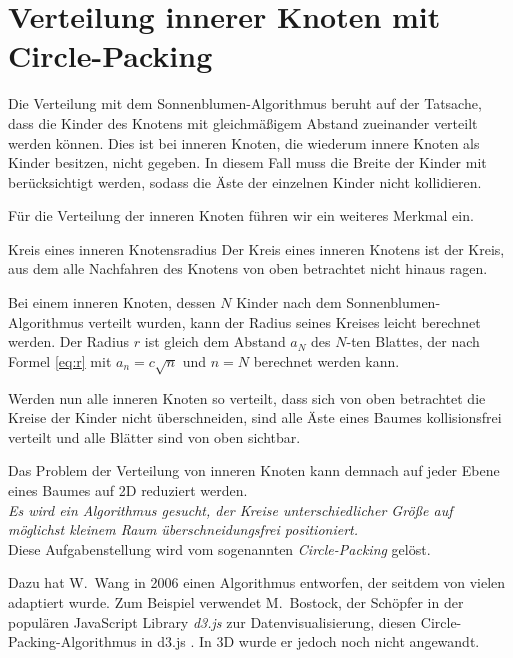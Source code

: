 \section{Verteilung innerer Knoten mit Circle-Packing}
\label{sec:Circle-Packing}

Die Verteilung mit dem Sonnenblumen-Algorithmus beruht auf der Tatsache, dass die Kinder des Knotens mit gleichmäßigem Abstand zueinander verteilt werden können. Dies ist bei inneren Knoten, die wiederum innere Knoten als Kinder besitzen, nicht gegeben. In diesem Fall muss die Breite der Kinder mit berücksichtigt werden, sodass die Äste der einzelnen Kinder nicht kollidieren.

Für die Verteilung der inneren Knoten führen wir ein weiteres Merkmal ein.

\begin{defbox}{Kreis eines inneren Knotens}{radius}
   Der Kreis eines inneren Knotens ist der Kreis, aus dem alle Nachfahren des Knotens von oben betrachtet nicht hinaus ragen.
\end{defbox}

Bei einem inneren Knoten, dessen $N$ Kinder nach dem Sonnenblumen-Algorithmus verteilt wurden, kann der Radius seines Kreises leicht berechnet werden. Der Radius $r$ ist gleich dem Abstand $a_N$ des $N$-ten Blattes, der nach Formel \ref{eq:r} mit $a_n = c \sqrt{n}$ und $n = N$ berechnet werden kann.

Werden nun alle inneren Knoten so verteilt, dass sich von oben betrachtet die Kreise der Kinder nicht überschneiden, sind alle Äste eines Baumes kollisionsfrei verteilt und alle Blätter sind von oben sichtbar.

Das Problem der Verteilung von inneren Knoten kann demnach auf jeder Ebene eines Baumes auf 2D reduziert werden.\\

\textit{Es wird ein Algorithmus gesucht, der Kreise unterschiedlicher Größe auf möglichst kleinem Raum überschneidungsfrei positioniert.}\\

Diese Aufgabenstellung wird vom sogenannten \textit{Circle-Packing} gelöst.

Dazu hat W.\ Wang in \cite{wang2006visualization} 2006 einen Algorithmus entworfen, der seitdem von vielen adaptiert wurde. Zum Beispiel verwendet M.\ Bostock, der Schöpfer in der populären JavaScript Library \textit{d3.js} zur Datenvisualisierung, diesen Circle-Packing-Algorithmus in d3.js \cite{bostock2017abetter}. In 3D wurde er jedoch noch nicht angewandt.

